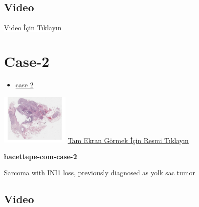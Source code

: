 \documentclass[
  letterpaper,
  DIV=11,
  numbers=noendperiod]{scrreprt}
\providecommand{\tightlist}{%
  \setlength{\itemsep}{0pt}\setlength{\parskip}{0pt}}\usepackage{longtable,booktabs,array}
\begin{document}
\hypertarget{video}{%
\subsection{Video}\label{video}}

\href{https://www.youtube.com/watch?v=nfFtViUXHqU}{Video İçin Tıklayın}

\hypertarget{sec-hacettepe-case-of-the-month-case-2}{%
\section{Case-2}\label{sec-hacettepe-case-of-the-month-case-2}}

\begin{itemize}
\tightlist
\item
  \href{https://www.youtube.com/watch?v=xHQihI19L5g\&ab_channel=KemalKosemehmetoglu}{case
  2}
\end{itemize}

\href{https://images.patolojiatlasi.com/hacettepe-com-case-2/HE.html}{\includegraphics[width=0.25\textwidth,height=\textheight]{./screenshots/thumbnail_hacettepe-com-case-2.png}}
\href{https://images.patolojiatlasi.com/hacettepe-com-case-2/HE.html}{Tam
Ekran Görmek İçin Resmi Tıklayın}

\textbf{hacettepe-com-case-2}

\begin{tcolorbox}[enhanced jigsaw, colbacktitle=quarto-callout-tip-color!10!white, colback=white, titlerule=0mm, opacityback=0, colframe=quarto-callout-tip-color-frame, opacitybacktitle=0.6, bottomrule=.15mm, breakable, coltitle=black, title=\textcolor{quarto-callout-tip-color}{\faLightbulb}\hspace{0.5em}{Tanı}, toprule=.15mm, toptitle=1mm, bottomtitle=1mm, arc=.35mm, rightrule=.15mm, leftrule=.75mm, left=2mm]

Sarcoma with INI1 loss, previously diagnosed as yolk sac tumor

\end{tcolorbox}

\hypertarget{video-1}{%
\subsection{Video}\label{video-1}}
\end{document}
